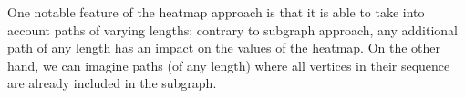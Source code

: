 One notable feature of the heatmap approach is that it is able to take into account paths of varying lengths; contrary to subgraph approach, any additional path of any length has an impact on the values of the heatmap. On the other hand, we can imagine paths (of any length) where all vertices in their sequence are already included in the subgraph.



